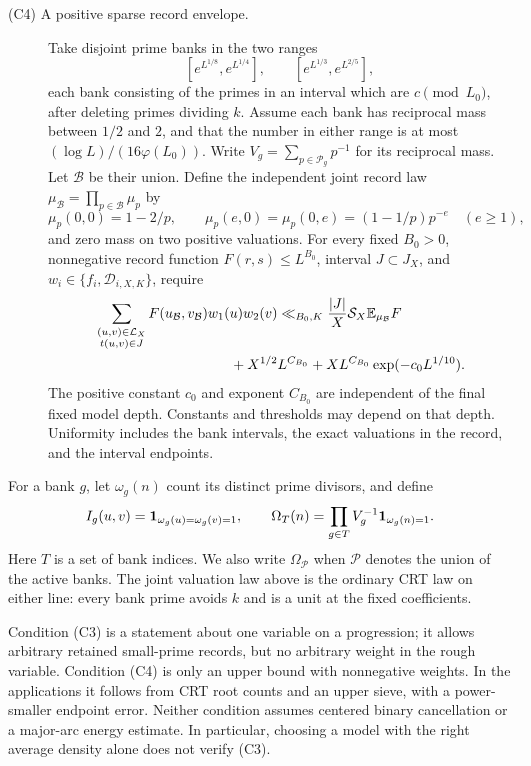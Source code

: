 \begin{description}
\item[\textup{(C4)} A positive sparse record envelope.]
Take disjoint prime banks in the two ranges
\[
 [e^{L^{1/8}},e^{L^{1/4}}],\qquad
 [e^{L^{1/3}},e^{L^{2/5}}],
\]
each bank consisting of the primes in an interval which are
\(c\pmod{L_0}\), after deleting primes dividing \(k\). Assume each
bank has reciprocal mass between \(1/2\) and \(2\), and that the
number in either range is at most \((\log L)/(16\varphi(L_0))\).
Write \(V_g=\sum_{p\in\mathcal P_g}p^{-1}\) for its reciprocal mass.
Let \(\mathcal B\) be their union. Define the independent joint
record law \(\mu_{\mathcal B}=\prod_{p\in\mathcal B}\mu_p\) by
\begin{equation}\label{eq:bank-law}
 \mu_p(0,0)=1-2/p,\qquad
 \mu_p(e,0)=\mu_p(0,e)=(1-1/p)p^{-e}\quad(e\ge1),
\end{equation}
and zero mass on two positive valuations.
For every fixed \(B_0>0\), nonnegative record function
\(F(r,s)\le L^{B_0}\), interval \(J\subset J_X\), and
\(w_i\in\{f_i,\mathcal D_{i,X,K}\}\), require
\begin{align}
 &\sum_{\substack{(u,v)\in\mathcal L_X\\t(u,v)\in J}}
     F(u_{\mathcal B},v_{\mathcal B})w_1(u)w_2(v)
       \ll_{B_0,K}\frac{|J|}{X}\mathcal S_X
                              \E_{\mu_{\mathcal B}}F\notag\\
 &\hspace{34mm}
       +X^{1/2}L^{C_{B_0}}
       +XL^{C_{B_0}}\exp(-c_0L^{1/10}).
                                                        \label{eq:comparison-envelope}
\end{align}
The positive constant \(c_0\) and exponent \(C_{B_0}\) are
independent of the final fixed model depth. Constants and thresholds
may depend on that depth. Uniformity includes the bank intervals,
the exact valuations in the record, and the interval endpoints.
\end{description}

For a bank \(g\), let \(\omega_g(n)\) count its distinct prime
divisors, and define
\[
 I_g(u,v)=\mathbf 1_{\omega_g(u)=\omega_g(v)=1},\qquad
 \Omega_T(n)=\prod_{g\in T}V_g^{-1}\mathbf 1_{\omega_g(n)=1}.
\]
Here \(T\) is a set of bank indices. We also write
\(\Omega_{\mathcal P}\) when \(\mathcal P\) denotes the union of
the active banks. The joint valuation law above
is the ordinary CRT law on either line: every bank prime avoids
\(k\) and is a unit at the fixed coefficients.

Condition (C3) is a statement about one variable on a progression;
it allows arbitrary retained small-prime records, but no arbitrary
weight in the rough variable. Condition (C4) is only an upper bound
with nonnegative weights. In the applications it follows from CRT
root counts and an upper sieve, with a power-smaller endpoint error.
Neither condition assumes centered binary cancellation or a major-arc
energy estimate. In particular, choosing a model with the right
average density alone does not verify (C3).

